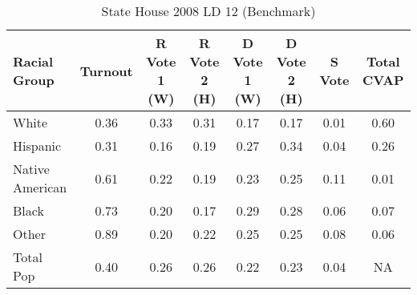 \begin{table}[htb]
\begin{center}
\caption{State House 2008 LD 12 (Benchmark)}
\label{sthse08_cvap_ld_12}
\begin{tabular}{lccccccc}
  \hline
Racial Group & Turnout & R Vote 1 (W) & R Vote 2 (H) & D Vote 1 (W) & D Vote 2 (H) & S Vote & Total CVAP \\ 
  \hline
 White & 0.36  & 0.33  & 0.31  & 0.17  & 0.17  & 0.01  & 0.60 \\
    Hispanic & 0.31  & 0.16  & 0.19  & 0.27  & 0.34  & 0.04  & 0.26 \\
    Native American & 0.61  & 0.22  & 0.19  & 0.23  & 0.25  & 0.11  & 0.01 \\
    Black & 0.73  & 0.20  & 0.17  & 0.29  & 0.28  & 0.06  & 0.07 \\
    Other & 0.89  & 0.20  & 0.22  & 0.25  & 0.25  & 0.08  & 0.06 \\
    Total Pop & 0.40  & 0.26  & 0.26  & 0.22  & 0.23  & 0.04  & NA \\
   \hline
\end{tabular}
\end{center}
\end{table}